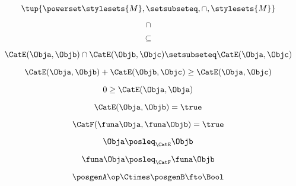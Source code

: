 {\begin{forslides}
    \begin{equation}
        \label{eq:slides_enrichment_44}
        \tup{\powerset \stylesets{M}, \setsubseteq, \cap, \stylesets{M}}
    \end{equation}

    \begin{equation}
        \label{eq:slides_enrichment_45}
        \cap
    \end{equation}

    \begin{equation}
        \label{eq:slides_enrichment_46}
        \subseteq
    \end{equation}

    \begin{equation}
        \label{eq:slides_enrichment_47}
        \CatE(\Obja, \Objb) \cap \CatE(\Objb, \Objc) \setsubseteq \CatE(\Obja, \Objc)
    \end{equation}

    \begin{equation}
        \label{eq:slides_enrichment_48}
        \CatE(\Obja, \Objb) + \CatE(\Objb, \Objc) \geq \CatE(\Obja, \Objc)
    \end{equation}

    \begin{equation}
        \label{eq:slides_enrichment_49}
        0 \geq \CatE(\Obja, \Obja)
    \end{equation}

    \begin{equation}
        \label{eq:slides_enrichment_50}
        \CatE(\Obja,\Objb) = \true
    \end{equation}

    \begin{equation}
        \label{eq:slides_enrichment_51}
        \CatF(\funa \Obja, \funa \Objb) = \true
    \end{equation}

    \begin{equation}
        \label{eq:slides_enrichment_52}
        \Obja \posleq_{\CatE} \Objb
    \end{equation}

    \begin{equation}
        \label{eq:slides_enrichment_53}
        \funa \Obja \posleq_{\CatF} \funa \Objb
    \end{equation}

    \begin{equation}
        \label{eq:slides_enrichment_54}
        \posgenA\op \Ctimes \posgenB \fto \Bool
    \end{equation}


\end{forslides}}
